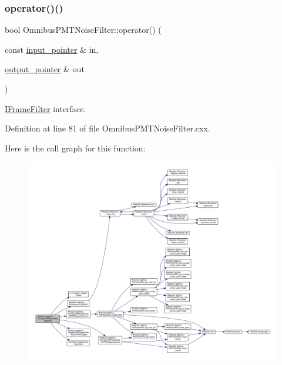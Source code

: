 \subsubsection{\texorpdfstring{operator()()}{operator()()}}
{\footnotesize\ttfamily bool Omnibus\+P\+M\+T\+Noise\+Filter\+::operator() (\begin{DoxyParamCaption}\item[{const \hyperlink{class_wire_cell_1_1_i_function_node_a55c0946156df9b712b8ad1a0b59b2db6}{input\+\_\+pointer} \&}]{in,  }\item[{\hyperlink{class_wire_cell_1_1_i_function_node_afc02f1ec60d31aacddf64963f9ca650b}{output\+\_\+pointer} \&}]{out }\end{DoxyParamCaption})\hspace{0.3cm}{\ttfamily [virtual]}}



\hyperlink{class_wire_cell_1_1_i_frame_filter}{I\+Frame\+Filter} interface. 



Definition at line 81 of file Omnibus\+P\+M\+T\+Noise\+Filter.\+cxx.

Here is the call graph for this function\+:
\nopagebreak
\begin{figure}[H]
\begin{center}
\leavevmode
\includegraphics[width=350pt]{class_wire_cell_1_1_sig_proc_1_1_omnibus_p_m_t_noise_filter_ad33bf21dae5ad22503a33e6444057dcb_cgraph}
\end{center}
\end{figure}
\mbox{\label{class_wire_cell_1_1_sig_proc_1_1_omnibus_p_m_t_noise_filter_a5d53fbe0bbc137cfc1e432b957fbb696}} 
